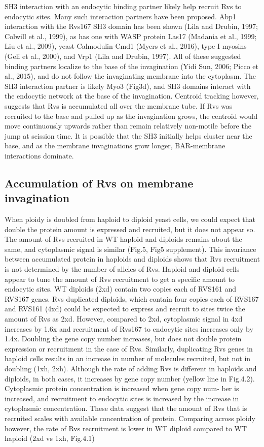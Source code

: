\documentclass[9pt,lineno]{elife}
\begin{document}
SH3 interaction with an endocytic binding partner likely help recruit Rvs to endocytic sites. Many such interaction partners have been proposed. Abp1 interaction with the Rvs167 SH3 domain has been shown (Lila and Drubin, 1997; Colwill et al., 1999), as has one with WASP protein Las17 (Madania et al., 1999; Liu et al., 2009), yeast Calmodulin Cmd1 (Myers et al., 2016), type I myosins (Geli et al., 2000), and Vrp1 (Lila and Drubin, 1997). All of these suggested binding partners localize to the base of the invagination (Yidi Sun, 2006; Picco et al., 2015), and do not follow the invaginating membrane into the cytoplasm. The SH3 interaction partner is likely Myo3 (Fig3d), and SH3 domains interact with the endocytic network at the base of the invagination. Centroid tracking however, suggests that Rvs is accumulated all over the membrane tube. If Rvs was recruited to the base and pulled up as the invagination grows, the centroid would move continuously upwards rather than remain relatively non-motile before the jump at scission time. It is possible that the SH3 initially helps cluster near the base, and as the membrane invaginations grow longer, BAR-membrane interactions dominate.


\subsection{Accumulation of Rvs on membrane invagination}
When ploidy is doubled from haploid to diploid yeast cells, we could expect that double the protein amount is expressed and recruited, but it does not appear so. The amount of Rvs recruited in WT haploid  and diploids remains about the same, and cytoplasmic signal is similar (Fig.5, Fig5 supplement). This invariance between accumulated protein in haploids and diploids shows that Rvs recruitment is not determined by the number of alleles of Rvs. Haploid and diploid cells appear to tune the amount of Rvs recruitment to get a specific amount to endocytic sites.
WT diploids (2xd) contain two copies each of RVS161 and RVS167 genes. Rvs duplicated diploids, which contain four copies each of RVS167 and RVS161 (4xd) could be expected to express and recruit to sites twice the amount of Rvs as 2xd. However, compared to 2xd, cytoplasmic signal in 4xd increases by 1.6x and recruitment of Rvs167 to endocytic sites increases only by 1.4x. Doubling the gene copy number increases, but does not double protein expression or recruitment in the case of Rvs. Similarly, duplicating Rvs genes in haploid cells results in an increase in number of molecules recruited, but not in doubling (1xh, 2xh). Although the rate of adding Rvs is different in haploids and diploids, in both cases, it increases by gene copy number (yellow line in Fig.4.2).
Cytoplasmic protein concentration is increased when gene copy num- ber is increased, and recruitment to endocytic sites is increased by the increase in cytoplasmic concentration. These data suggest that the amount of Rvs that is recruited scales with available concentration of protein. Comparing across ploidy however, the rate of Rvs recruitment is lower in WT diploid compared to WT haploid (2xd vs 1xh, Fig.4.1)
\end{document}
